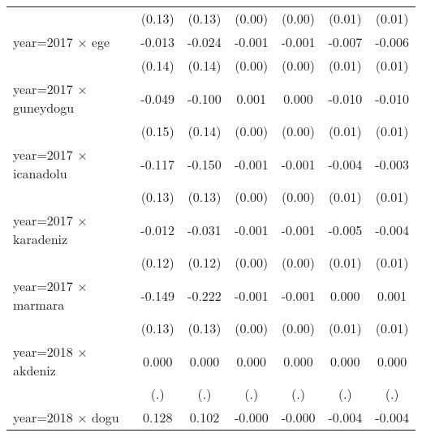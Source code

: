 {\begin{tabular}{l*{6}{c}}
                    &      (0.13)         &      (0.13)         &      (0.00)         &      (0.00)         &      (0.01)         &      (0.01)         \\
year=2017 $\times$ ege&      -0.013         &      -0.024         &      -0.001         &      -0.001         &      -0.007         &      -0.006         \\
                    &      (0.14)         &      (0.14)         &      (0.00)         &      (0.00)         &      (0.01)         &      (0.01)         \\
year=2017 $\times$ guneydogu&      -0.049         &      -0.100         &       0.001         &       0.000         &      -0.010         &      -0.010         \\
                    &      (0.15)         &      (0.14)         &      (0.00)         &      (0.00)         &      (0.01)         &      (0.01)         \\
year=2017 $\times$ icanadolu&      -0.117         &      -0.150         &      -0.001         &      -0.001         &      -0.004         &      -0.003         \\
                    &      (0.13)         &      (0.13)         &      (0.00)         &      (0.00)         &      (0.01)         &      (0.01)         \\
year=2017 $\times$ karadeniz&      -0.012         &      -0.031         &      -0.001         &      -0.001         &      -0.005         &      -0.004         \\
                    &      (0.12)         &      (0.12)         &      (0.00)         &      (0.00)         &      (0.01)         &      (0.01)         \\
year=2017 $\times$ marmara&      -0.149         &      -0.222         &      -0.001         &      -0.001         &       0.000         &       0.001         \\
                    &      (0.13)         &      (0.13)         &      (0.00)         &      (0.00)         &      (0.01)         &      (0.01)         \\
year=2018 $\times$ akdeniz&       0.000         &       0.000         &       0.000         &       0.000         &       0.000         &       0.000         \\
                    &         (.)         &         (.)         &         (.)         &         (.)         &         (.)         &         (.)         \\
year=2018 $\times$ dogu&       0.128         &       0.102         &      -0.000         &      -0.000         &      -0.004         &      -0.004         \\

\end{tabular}}
